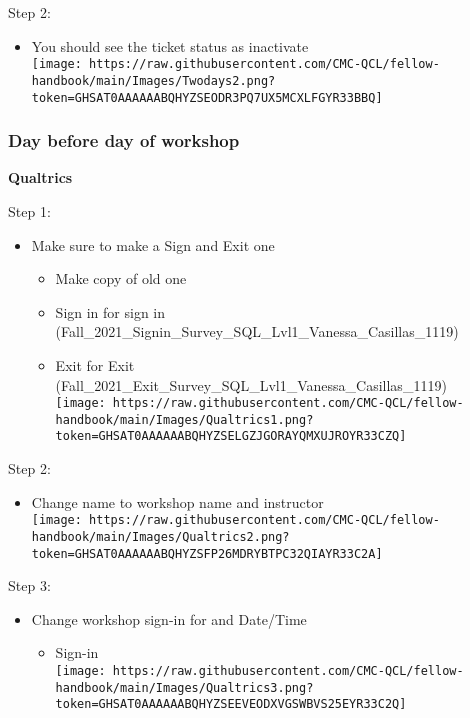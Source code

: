 \documentclass[
]{book}
\providecommand{\tightlist}{%
  \setlength{\itemsep}{0pt}\setlength{\parskip}{0pt}}
\begin{document}
Step 2:

\begin{itemize}
\tightlist
\item
  You should see the ticket status as inactivate\\
  \texttt{[image: https://raw.githubusercontent.com/CMC-QCL/fellow-handbook/main/Images/Twodays2.png?token=GHSAT0AAAAAABQHYZSEODR3PQ7UX5MCXLFGYR33BBQ]}
\end{itemize}

\hypertarget{day-before-day-of-workshop}{%
\subsubsection{\texorpdfstring{Day before day of workshop }{Day before day of workshop }}\label{day-before-day-of-workshop}}

\textbf{Qualtrics}

Step 1:

\begin{itemize}
\tightlist
\item
  Make sure to make a Sign and Exit one

  \begin{itemize}
  \tightlist
  \item
    Make copy of old one\\
  \item
    Sign in for sign in (Fall\_2021\_Signin\_Survey\_SQL\_Lvl1\_Vanessa\_Casillas\_1119)\\
  \item
    Exit for Exit (Fall\_2021\_Exit\_Survey\_SQL\_Lvl1\_Vanessa\_Casillas\_1119)\\
    \texttt{[image: https://raw.githubusercontent.com/CMC-QCL/fellow-handbook/main/Images/Qualtrics1.png?token=GHSAT0AAAAAABQHYZSELGZJGORAYQMXUJROYR33CZQ]}
  \end{itemize}
\end{itemize}

Step 2:

\begin{itemize}
\tightlist
\item
  Change name to workshop name and instructor\\
  \texttt{[image: https://raw.githubusercontent.com/CMC-QCL/fellow-handbook/main/Images/Qualtrics2.png?token=GHSAT0AAAAAABQHYZSFP26MDRYBTPC32QIAYR33C2A]}
\end{itemize}

Step 3:

\begin{itemize}
\tightlist
\item
  Change workshop sign-in for and Date/Time

  \begin{itemize}
  \tightlist
  \item
    Sign-in\\
    \texttt{[image: https://raw.githubusercontent.com/CMC-QCL/fellow-handbook/main/Images/Qualtrics3.png?token=GHSAT0AAAAAABQHYZSEEVEODXVGSWBVS25EYR33C2Q]}
  \end{itemize}
\end{itemize}
\end{document}
